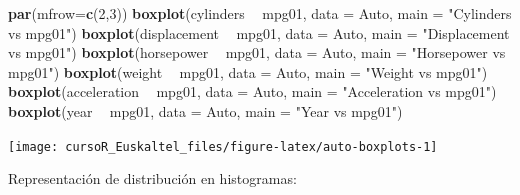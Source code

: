 \documentclass[]{book}
\newenvironment{Shaded}{\begin{snugshade}}{\end{snugshade}}
\newcommand{\KeywordTok}[1]{\textcolor[rgb]{0.13,0.29,0.53}{\textbf{#1}}}
\newcommand{\DataTypeTok}[1]{\textcolor[rgb]{0.13,0.29,0.53}{#1}}
\newcommand{\DecValTok}[1]{\textcolor[rgb]{0.00,0.00,0.81}{#1}}
\newcommand{\StringTok}[1]{\textcolor[rgb]{0.31,0.60,0.02}{#1}}
\newcommand{\OperatorTok}[1]{\textcolor[rgb]{0.81,0.36,0.00}{\textbf{#1}}}
\newcommand{\NormalTok}[1]{#1}
\begin{document}
\begin{Shaded}
\begin{Highlighting}[]
\KeywordTok{par}\NormalTok{(}\DataTypeTok{mfrow=}\KeywordTok{c}\NormalTok{(}\DecValTok{2}\NormalTok{,}\DecValTok{3}\NormalTok{))}
\KeywordTok{boxplot}\NormalTok{(cylinders }\OperatorTok{~}\StringTok{ }\NormalTok{mpg01, }\DataTypeTok{data =}\NormalTok{ Auto, }\DataTypeTok{main =} \StringTok{"Cylinders vs mpg01"}\NormalTok{)}
\KeywordTok{boxplot}\NormalTok{(displacement }\OperatorTok{~}\StringTok{ }\NormalTok{mpg01, }\DataTypeTok{data =}\NormalTok{ Auto, }\DataTypeTok{main =} \StringTok{"Displacement vs mpg01"}\NormalTok{)}
\KeywordTok{boxplot}\NormalTok{(horsepower }\OperatorTok{~}\StringTok{ }\NormalTok{mpg01, }\DataTypeTok{data =}\NormalTok{ Auto, }\DataTypeTok{main =} \StringTok{"Horsepower vs mpg01"}\NormalTok{)}
\KeywordTok{boxplot}\NormalTok{(weight }\OperatorTok{~}\StringTok{ }\NormalTok{mpg01, }\DataTypeTok{data =}\NormalTok{ Auto, }\DataTypeTok{main =} \StringTok{"Weight vs mpg01"}\NormalTok{)}
\KeywordTok{boxplot}\NormalTok{(acceleration }\OperatorTok{~}\StringTok{ }\NormalTok{mpg01, }\DataTypeTok{data =}\NormalTok{ Auto, }\DataTypeTok{main =} \StringTok{"Acceleration vs mpg01"}\NormalTok{)}
\KeywordTok{boxplot}\NormalTok{(year }\OperatorTok{~}\StringTok{ }\NormalTok{mpg01, }\DataTypeTok{data =}\NormalTok{ Auto, }\DataTypeTok{main =} \StringTok{"Year vs mpg01"}\NormalTok{)}
\end{Highlighting}
\end{Shaded}

\begin{center}\texttt{[image: cursoR\_Euskaltel\_files/figure-latex/auto-boxplots-1]} \end{center}

Representación de distribución en histogramas:
\end{document}
